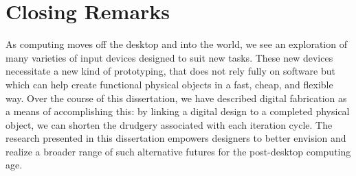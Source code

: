 \section{Closing Remarks}

As computing moves off the desktop and into the world, we see an exploration of many varieties of input devices designed to suit new tasks. These new devices necessitate a new kind of prototyping, that does not rely fully on software but which can help create functional physical objects in a fast, cheap, and flexible way. Over the course of this dissertation, we have described digital fabrication as a means of accomplishing this: by linking a digital design to a completed physical object, we can shorten the drudgery associated with each iteration cycle. The research presented in this dissertation empowers designers to better envision and realize a broader range of such alternative futures for the post-desktop computing age. 